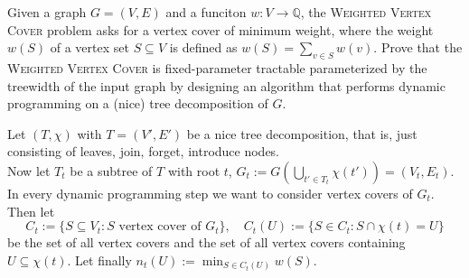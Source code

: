 \documentclass{article}
\begin{document}
\begin{exercise}
    Given a graph $G=(V,E)$ and a funciton $w: V\to \mathbb Q$, the \textsc{Weighted Vertex Cover} problem asks for a vertex cover of minimum weight, where the weight $w(S)$ of a vertex set $S\subseteq V$ is defined as $w(S) = \sum_{v\in S} w(v)$. Prove that the \textsc{Weighted Vertex Cover} is fixed-parameter tractable parameterized by the treewidth of the input graph by designing an algorithm that performs dynamic programming on a (nice) tree decomposition of $G$.
\end{exercise}
\begin{solving}
    Let $(T, \chi)$ with $T= (V', E')$ be a nice tree decomposition, that is, just consisting of leaves, join, forget, introduce nodes. \\
    Now let $T_t$ be a subtree of $T$ with root $t$, $G_t:= G(\bigcup_{t'\in T_t}\chi(t')) = (V_t, E_t)$. In every dynamic programming step we want to consider vertex covers of $G_t$. Then let \begin{equation*}
        C_t:= \{S\subseteq V_t: S \text{ vertex cover of } G_t\}, \quad C_t(U):= \{S\in C_t: S\cap \chi(t) = U\}
    \end{equation*} be the set of all vertex covers and the set of all vertex covers containing $U\subseteq \chi(t)$. Let finally $n_t(U):= \min_{S\in C_t(U)}w(S)$. 


\end{solving}
\end{document}
